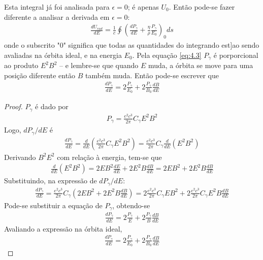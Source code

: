 Esta integral já foi analisada para $\epsilon=0$; é apenas $U_0$. Então pode-se fazer diferente a analisar a derivada em $\epsilon=0$:
\begin{align}
	\frac{dU_{rad}}{dE} = \frac{1}{c} \oint \left(\frac{dP_\gamma}{dE}+ \frac{\eta}{\rho}\frac{P_\gamma}{E_0}\right)_0 ds\label{eq:4.14}
\end{align}
onde o subscrito "0" significa que todas as quantidades do integrando est]ao sendo avaliadas na órbita ideal, e na energia $E_0$. Pela equação \eqref{eq:4.3} $P_\gamma$ é porporcional ao produto $E^2B^2$ -- e lembre-se que quando $E$ muda, a órbita se move para uma posição diferente então $B$ também muda. Então pode-se escrever que
\begin{align*}
	\frac{dP_\gamma}{dE} = 2\frac{P_\gamma}{E_0} + 2\frac{P_\gamma}{B_0}\frac{dB}{dE}
\end{align*}

\begin{proof}
	$P_\gamma$ é dado por
	\begin{align*}
		P_\gamma = \frac{e^2c^3}{2\pi}C_\gamma E^2 B^2
	\end{align*}
	Logo, $dP_\gamma/dE$ é
	\begin{align*}
		\frac{dP_\gamma}{dE} = \frac{d}{dE}\left(\frac{e^2c^3}{2\pi}C_\gamma E^2 B^2\right) = \frac{e^2c^3}{2\pi}C_\gamma \frac{d}{dE}(E^2B^2)
	\end{align*}
	Derivando $B^2E^2$ com relação à energia, tem-se que
	\begin{align*}
		\frac{d}{dE}(E^2B^2) = 2EB^2\frac{dE}{dE} + 2E^2B\frac{dB}{dE} = 2EB^2 + 2E^2B\frac{dB}{dE}
	\end{align*}
	Substituindo, na expressão de $dP_\gamma/dE$:
	\begin{align*}
		\frac{dP_\gamma}{dE} = \frac{e^2c^3}{2\pi}C_\gamma \left(2EB^2 + 2E^2B\frac{dB}{dE}\right) = 2\frac{e^2c^3}{2\pi}C_\gamma E B^2 + 2\frac{e^2c^3}{2\pi}C_\gamma E^2 B \frac{dB}{dE}
	\end{align*}
	Pode-se substituir a equação de $P_\gamma$, obtendo-se
	\begin{align*}
		\frac{dP_\gamma}{dE} = 2\frac{P_\gamma}{E} + 2\frac{P_\gamma}{B}\frac{dB}{dE}
	\end{align*}
	Avaliando a expressão na órbita ideal,
	\begin{align*}
		\frac{dP_\gamma}{dE} = 2\frac{P_\gamma}{E_0} + 2\frac{P_\gamma}{B_0}\frac{dB}{dE}
	\end{align*}
\end{proof}


